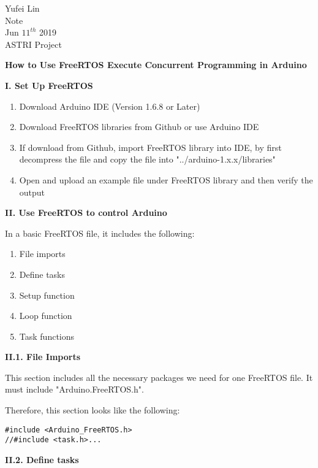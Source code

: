 \documentclass[a4paper,12pt]{report}
\begin{document}
\noindent
Yufei Lin\\

\noindent
Note\\

\noindent
Jun \(11^{th}\) 2019\\

\noindent
ASTRI Project

\begin{center}
\textbf{How to Use FreeRTOS Execute Concurrent Programming in Arduino}
\end{center}


\noindent
\textbf{I. Set Up FreeRTOS}

\begin{enumerate}
\item Download Arduino IDE (Version 1.6.8 or Later)
\item Download FreeRTOS libraries from Github or use Arduino IDE
\item If download from Github, import FreeRTOS library into IDE, by first decompress the file and copy the file into "../arduino-1.x.x/libraries"
\item Open and upload an example file under FreeRTOS library and then verify the output
\end{enumerate}

\noindent
\textbf{II. Use FreeRTOS to control Arduino}

\noindent
In a basic FreeRTOS file, it includes the following:

\begin{enumerate}
\item File imports
\item Define tasks
\item Setup function
\item Loop function
\item Task functions
\end{enumerate}

\noindent
\textbf{II.1. File Imports}

\noindent
This section includes all the necessary packages we need for one FreeRTOS file. It must include "Arduino.FreeRTOS.h".

\noindent
Therefore, this section looks like the following:
\begin{lstlisting}[style=CStyle]
#include <Arduino_FreeRTOS.h>
//#include <task.h>...
\end{lstlisting}

\noindent
\textbf{II.2. Define tasks}
\end{document}
